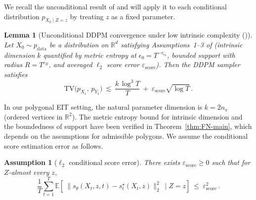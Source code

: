 \documentclass{article}
\newcommand{\R}{\mathbb{R}}
\newtheorem{lemma}[theorem]{Lemma}
\newtheorem{assumption}[theorem]{Assumption}
\begin{document}
We recall the unconditional result of \citet[Thm.~2]{liang2025low} and will apply it to each conditional
distribution $p_{X_0\mid Z=z}$ by treating $z$ as a fixed parameter. 

\begin{lemma}[Unconditional DDPM convergence under low intrinsic complexity
{\rm(\citealp[Thm.~2]{liang2025low})}]\label{lem:liang-ddpm}
Let $X_0\sim p_{\mathrm{data}}$ be a distribution on $\R^d$ satisfying Assumptions~1--3 of
\citet{liang2025low} (intrinsic dimension $k$ quantified by metric entropy at $\epsilon_0=T^{-c_{\epsilon_0}}$,
bounded support with radius $R=T^{c_R}$, and averaged $\ell_2$ score error $\varepsilon_{\mathrm{score}}$).
Then the DDPM sampler satisfies
\begin{equation}\label{eq:TV_bound_uncond}
\mathrm{TV}\bigl(p_{X_1},\,p_{Y_1}\bigr)
\ \lesssim\ \frac{k\,\log^3 T}{T}\ +\ \varepsilon_{\mathrm{score}}\sqrt{\log T}\,.
\end{equation}
\end{lemma}

In our polygonal EIT setting, the natural parameter dimension is $k=2n_{\mathrm v}$ (ordered vertices in
$\R^2$). The metric entropy bound for intrinsic dimension and the boundedness of support have been verified in
Theorem~\ref{thm:FN-main}, which depends on the assumptions for admissible polygons. We assume the conditional score estimation error as follows.

\begin{assumption}[$\ell_2$ conditional score error]\label{ass:cond_score}
There exists $\varepsilon_{\mathrm{score}}\ge 0$ such that for $Z$-almost every $z$,
\[
\frac{1}{T}\sum_{t=1}^T
\mathbb E\!\left[\ \big\|s_{\theta}(X_t,z,t)-s_t^{\star}(X_t,z)\big\|_2^2\ \mid Z=z \right]
\ \le\ \varepsilon_{\mathrm{score}}^2\,.
\]
\end{assumption}
\end{document}
